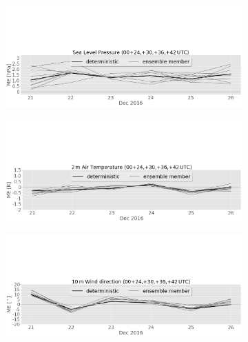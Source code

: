 \begin{figure}[!t]%
	\centering
	\begin{subfigure}[b]{\textwidth}
		\includegraphics[trim={0cm 0cm 0cm 9.5cm},clip,width=\textwidth]{./fig_sfc_pressure/ME_20161220_26_00}
		\caption{}\label{fig:bias:pres}
	\end{subfigure}
	\begin{subfigure}[b]{\textwidth}
		\includegraphics[trim={0cm 0cm 0cm 9.5cm},clip,width=\textwidth]{./fig_sfc_temp/ME_20161220_26_00}
		\caption{}\label{fig:bias:temp}
	\end{subfigure}
	\begin{subfigure}[b]{\textwidth}
		\includegraphics[trim={0cm 0cm 0cm 9.5cm},clip,width=\textwidth]{./fig_sfc_wd/ME_20161220_26_00}
		\caption{}\label{fig:bias:wd}
	\end{subfigure}

\end{figure}
